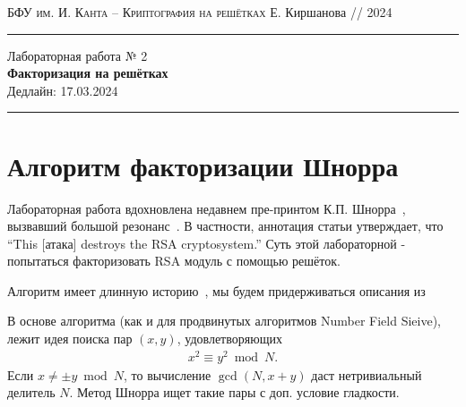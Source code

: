 \documentclass[11pt]{exam}
\theoremstyle{definition}
\begin{document}
	{\noindent
		\textsc{БФУ им. И. Канта -- Криптография на решётках}
		\hfill {Е. Киршанова // 2024\\}
\hrule
\begin{center}
	{\LARGE
			Лабораторная работа № 2 \\[5pt]
			\textbf{Факторизация на решётках} \\[10pt]
	 	{Дедлайн: 17.03.2024} 
 	} 
\end{center}
\hrule \vspace{5mm}
	
	\thispagestyle{empty}
	
	\vspace{0.2cm}
	\section{Алгоритм факторизации Шнорра}
	
	Лабораторная работа вдохновлена недавнем пре-принтом К.П. Шнорра~\cite{Schnorr21}, вызвавший большой резонанс~\cite{twitter1,twitter2,stackexchange}. В частности, аннотация статьи утверждает, что ``This [атака] destroys the RSA cryptosystem.'' Суть этой лабораторной - попытаться факторизовать RSA модуль с помощью решёток. 
	
	Алгоритм имеет длинную историю~\cite{leogit}, мы будем придерживаться описания из~\cite{vera10}
	
	В основе алгоритма (как и для продвинутых алгоритмов Number Field Sieive), лежит идея поиска пар $(x,y)$, удовлетворяющих 
	\begin{align} \label{eq:congruence}
	x^2 \equiv y^2 \bmod N.
	\end{align}
	\noindent Если $x \neq \pm y \bmod N$, то вычисление $\gcd(N, x+y)$ даст нетривиальный делитель $N$. Метод Шнорра ищет такие пары с доп. условие гладкости.
	
}
\end{document}
